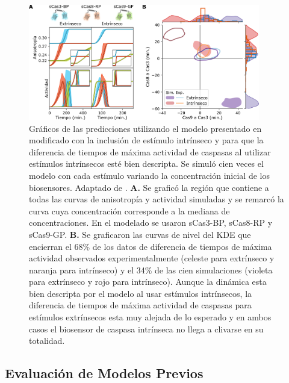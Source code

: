 \begin{figure}
    \centering
    \includegraphics[width=0.9\textwidth]{img/cap_4/force_corbat.png}
    \caption{\footnotesize{Gráficos de las predicciones utilizando el modelo presentado en \cite{Corbat2018} modificado con la inclusión de estímulo intrínseco y para que la diferencia de tiempos de máxima actividad de caspasas al utilizar estímulos intrínsecos esté bien descripta. Se simuló cien veces el modelo con cada estímulo variando la concentración inicial de los biosensores.  Adaptado de \cite{Corbat2021}. \textbf{A.} Se graficó la región que contiene a todas las curvas de anisotropía y actividad simuladas y se remarcó la curva cuya concentración corresponde a la mediana de concentraciones. En el modelado se usaron sCas3-BP, sCas8-RP y sCas9-GP. \textbf{B.} Se graficaron las curvas de nivel del KDE que encierran el 68\% de los datos de diferencia de tiempos de máxima actividad observados experimentalmente (celeste para extrínseco y naranja  para intrínseco) y el 34\% de las cien simulaciones (violeta para extrínseco y rojo  para intrínseco). Aunque la dinámica esta bien descripta por el modelo al usar estímulos intrínsecos, la diferencia de tiempos de máxima actividad de caspasas para estímulos extrínsecos esta muy alejada de lo esperado y en ambos casos el biosensor de caspasa intrínseca no llega a clivarse en su totalidad.}}
    \label{fig:CorbatForzado}
\end{figure}


\subsection{Evaluación de Modelos Previos}


